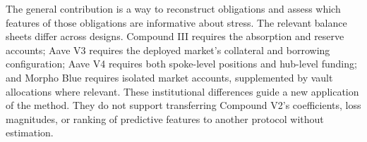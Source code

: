\documentclass[a4paper,UKenglish,cleveref, autoref, thm-restate]{informs3}
\newenvironment{latestrevisions}{\begingroup\color{red}\hypersetup{linkcolor=red,citecolor=red,urlcolor=red}}{\endgroup}
\begin{document}
\begin{latestrevisions}
The general contribution is a way to reconstruct obligations and assess which features of those obligations are informative about stress. The relevant balance sheets differ across designs. Compound III requires the absorption and reserve accounts; Aave V3 requires the deployed market's collateral and borrowing configuration; Aave V4 requires both spoke-level positions and hub-level funding; and Morpho Blue requires isolated market accounts, supplemented by vault allocations where relevant. These institutional differences guide a new application of the method. They do not support transferring Compound V2's coefficients, loss magnitudes, or ranking of predictive features to another protocol without estimation.
\end{latestrevisions}
\end{document}
